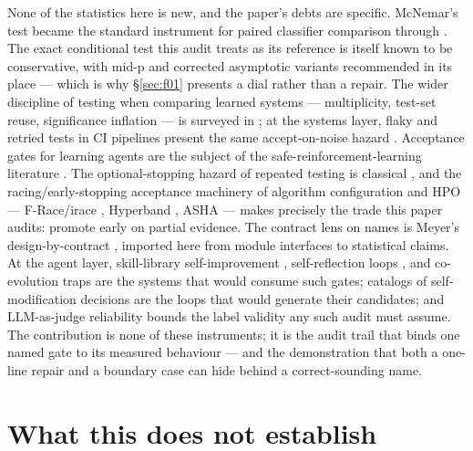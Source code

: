 \documentclass[10pt]{article}
\begin{document}
None of the statistics here is new, and the paper's debts are specific.
McNemar's test became the standard instrument for paired classifier
comparison through \citep{dietterich1998approximate}. The exact conditional
test this audit treats as its reference is itself known to be conservative,
with mid-p and corrected asymptotic variants recommended in its place
\citep{fagerland2013mcnemar} --- which is why \S\ref{sec:f01} presents a dial
rather than a repair. The wider discipline of testing when comparing learned
systems --- multiplicity, test-set reuse, significance inflation --- is
surveyed in \citep{dror2018hitchhiker}; at the systems layer, flaky and
retried tests in CI pipelines present the same accept-on-noise hazard
\citep{luo2016flaky}. Acceptance gates for learning agents are the subject of
the safe-reinforcement-learning literature \citep{garcia2015safe}. The
optional-stopping hazard of repeated testing is classical
\citep{wald1945sequential}, and the racing/early-stopping acceptance
machinery of algorithm configuration and HPO --- F-Race/irace
\citep{birattari2016irace}, Hyperband \citep{li2017hyperband}, ASHA
\citep{jamieson2016asha} --- makes precisely the trade this paper audits:
promote early on partial evidence. The contract lens on names is Meyer's
design-by-contract \citep{meyer1992contract}, imported here from module
interfaces to statistical claims. At the agent layer, skill-library
self-improvement \citep{wang2023voyager}, self-reflection loops
\citep{shinn2023reflexion}, and co-evolution traps \citep{feng2026cods} are the
systems that would consume such gates; catalogs of self-modification
decisions \citep{he2026failure} are the loops that would generate their
candidates; and LLM-as-judge reliability \citep{zheng2023judging} bounds the
label validity any such audit must assume. The contribution is none of these
instruments; it is the audit trail that binds one named gate to its measured
behaviour --- and the demonstration that both a one-line repair and a
boundary case can hide behind a correct-sounding name.

\section{What this does not establish}\label{sec:limits}
\end{document}
